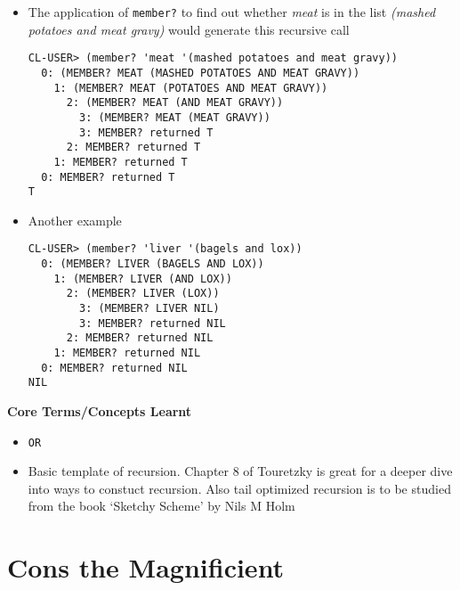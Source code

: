 \documentclass[11pt]{article}
\begin{document}
\begin{itemize}
\begin{verbatim}
(defun member? (a lat)
  (cond ((null lat) nil)
        (t (or (equal (car lat) a) (member? a (cdr lat))))))
\end{verbatim}
\item The application of \texttt{member?} to find out whether \emph{meat} is in the list \emph{(mashed potatoes and meat gravy)} would
generate this recursive call
\begin{verbatim}
CL-USER> (member? 'meat '(mashed potatoes and meat gravy))
  0: (MEMBER? MEAT (MASHED POTATOES AND MEAT GRAVY))
    1: (MEMBER? MEAT (POTATOES AND MEAT GRAVY))
      2: (MEMBER? MEAT (AND MEAT GRAVY))
        3: (MEMBER? MEAT (MEAT GRAVY))
        3: MEMBER? returned T
      2: MEMBER? returned T
    1: MEMBER? returned T
  0: MEMBER? returned T
T
\end{verbatim}
\item Another example
\begin{verbatim}
CL-USER> (member? 'liver '(bagels and lox))
  0: (MEMBER? LIVER (BAGELS AND LOX))
    1: (MEMBER? LIVER (AND LOX))
      2: (MEMBER? LIVER (LOX))
        3: (MEMBER? LIVER NIL)
        3: MEMBER? returned NIL
      2: MEMBER? returned NIL
    1: MEMBER? returned NIL
  0: MEMBER? returned NIL
NIL
\end{verbatim}
\end{itemize}

\textbf{Core Terms/Concepts Learnt}
\begin{itemize}
\item \texttt{OR}
\item Basic template of recursion. Chapter 8 of Touretzky is great for a deeper dive into ways to constuct recursion. Also
tail optimized recursion is to be studied from the book `Sketchy Scheme' by Nils M Holm
\end{itemize}

\newpage

\section{Cons the Magnificient}
\label{sec:org1568095}
\end{document}
